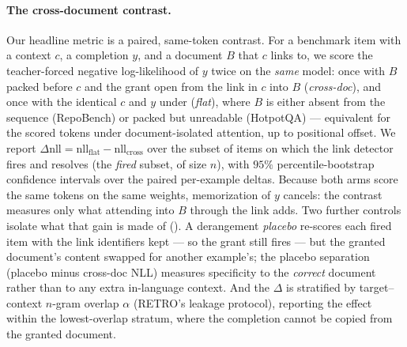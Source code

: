 \paragraph{The cross-document contrast.}
Our headline metric is a paired, same-token contrast. For a benchmark item with a
context $c$, a completion $y$, and a document $B$ that $c$ links to, we score the
teacher-forced negative log-likelihood of $y$ twice on the \emph{same} model: once
with $B$ packed before $c$ and the \crossdoc grant open from the link in $c$ into $B$
(\emph{cross-doc}), and once with the identical $c$ and $y$ under \doccausal
(\emph{flat}), where $B$ is either absent from the sequence (RepoBench) or packed but
unreadable (HotpotQA) --- equivalent for the scored tokens under document-isolated
attention, up to positional offset. We report
$\Delta\mathrm{nll}=\mathrm{nll}_\text{flat}-\mathrm{nll}_\text{cross}$ over the
subset of items on which the link detector fires and resolves (the \emph{fired}
subset, of size $n$), with $95\%$ percentile-bootstrap confidence intervals over the
paired per-example deltas. Because both arms score the same tokens on the same weights,
memorization of $y$ cancels: the contrast measures only what attending into $B$ through
the link adds. Two further controls isolate what that gain is made of
(). A derangement \emph{placebo} re-scores each fired
item with the link identifiers kept --- so the grant still fires --- but the granted
document's content swapped for another example's; the placebo separation (placebo minus
cross-doc NLL) measures specificity to the \emph{correct} document rather than to any
extra in-language context. And the $\Delta$ is stratified by target--context $n$-gram
overlap $\alpha$ (RETRO's leakage protocol), reporting the effect within the
lowest-overlap stratum, where the completion cannot be copied from the granted
document.

